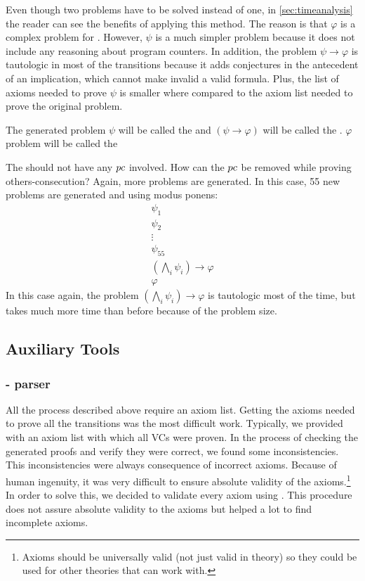 Even though two \spass problems have to be solved instead of one, in \ref{sec:timeanalysis} the reader can see the benefits of applying this method.
%
The reason is that $\varphi$ is a complex problem for \spass. 
%
However, $\psi$ is a much simpler problem because it does not include any reasoning about program counters. 
In addition, the problem $\psi \to \varphi$ is tautologic in most of the transitions because it adds conjectures in the antecedent of an implication, which cannot make invalid a valid formula.
%
Plus, the list of axioms needed to prove $\psi$ is smaller where compared to the axiom list needed to prove the original problem.


The generated problem $\psi$ will be called the \textbf{\reducedProblem} and $(\psi \to \varphi)$ will be called the \textbf{\smallToBig}. $\varphi$ problem will be called the \textbf{\originalProblem}

The \reducedProblem  should not have any $pc$ involved. How can the $pc$ be removed while proving others-consecution?
%
Again, more \spass problems are generated. 
%
In this case, 55 new problems are generated and using modus ponens:
\[
	\begin{array}{l}
		\psi_1\\
		\psi_2\\
		\vdots\\
		\psi_{55}\\
		(\bigwedge_i \psi_i) \to \varphi\\\hline
		\varphi
	\end{array}
\]
In this case again, the \spass problem $(\bigwedge_i \psi_i) \to \varphi$ is tautologic most of the time, but \spass takes much more time than before because of the problem size.




\subsection{Auxiliary Tools}
\subsubsection{\ocaml - parser}
All the process described above require an axiom list. 
%
Getting the axioms needed to prove all the transitions was the most difficult work. 
%
Typically, we provided \spass with an axiom list with which all \gls{VC}s were proven. In the process of checking the generated proofs and verify they were correct, we found some inconsistencies. 
%
This inconsistencies were always consequence of incorrect axioms. 
%
Because of human ingenuity, it was very difficult to ensure absolute validity of the axioms.\footnote{Axioms should be universally valid (not just valid in \TLLpL theory) so they could be used for other theories that \leap can work with.}
%
In order to solve this, we decided to validate every axiom using \leap. 
%
This procedure does not assure absolute validity to the axioms but helped a lot to find incomplete axioms.


